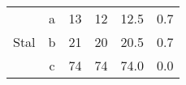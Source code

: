 \begin{table}[H]
{\begin{tabular}{|c|c|r|r|r|r|}
    \multirow{3}{*}{Stal}                                                                            & a        & 13                                 & 12                                 & 12.5                                  & 0.7                                      \\ \cline{2-6} 
                                                                                                     & b        & 21                                 & 20                                 & 20.5                                  & 0.7                                      \\ \cline{2-6} 
                                                                                                     & c        & 74                                 & 74                                 & 74.0                                  & 0.0                                      \\ \hline
    \end{tabular}%
    }
    \end{table}